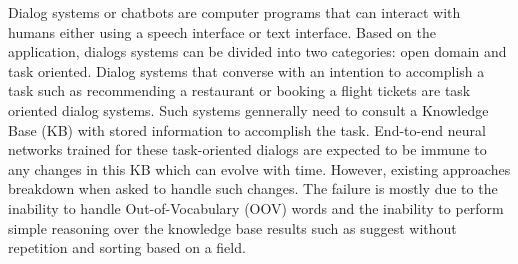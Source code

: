 Dialog systems or chatbots are computer programs that can interact with humans either using a speech interface or text interface. 
Based on the application, dialogs systems can be divided into two categories: open domain and task oriented. Dialog systems that converse with an intention to accomplish a task such as recommending a restaurant or booking a flight tickets are task oriented dialog systems. Such systems gennerally need to consult a Knowledge Base (KB) with stored information to accomplish the task. End-to-end neural networks trained for these task-oriented dialogs are expected to be immune to any changes in this KB which can evolve with time. However, existing approaches breakdown when asked to handle such changes. The failure is mostly due to the inability to handle Out-of-Vocabulary (OOV) words and the inability to perform simple reasoning over the knowledge base results such as suggest without repetition and sorting based on a field.





